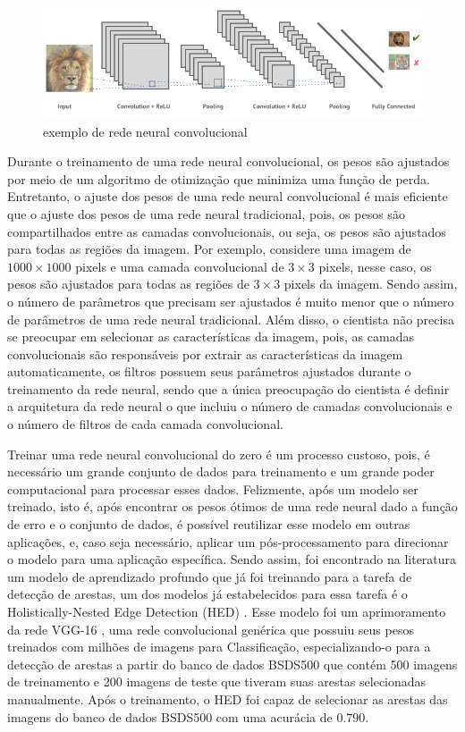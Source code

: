\documentclass[12pt]{article}
\begin{document}
\begin{figure}[H]
\centering
\includegraphics[scale=0.45]{conv.png}
\caption{exemplo de rede neural convolucional}
\label{fig:conv}
\end{figure}


Durante o treinamento de uma rede neural convolucional, os pesos são ajustados por meio de um algoritmo de otimização que minimiza uma função de perda. Entretanto, o ajuste dos pesos de uma rede neural convolucional é mais eficiente que o ajuste dos pesos de uma rede neural tradicional, pois, os pesos são compartilhados entre as camadas convolucionais, ou seja, os pesos são ajustados para todas as regiões da imagem. Por exemplo, considere uma imagem de $1000\times1000$ pixels e uma camada convolucional de $3\times3$ pixels, nesse caso, os pesos são ajustados para todas as regiões de $3\times3$ pixels da imagem. Sendo assim, o número de parâmetros que precisam ser ajustados é muito menor que o número de parâmetros de uma rede neural tradicional. Além disso, o cientista não precisa se preocupar em selecionar as características da imagem, pois, as camadas convolucionais são responsáveis por extrair as características da imagem automaticamente, os filtros possuem seus parâmetros ajustados durante o treinamento da rede neural, sendo que a única preocupação do cientista é definir a arquitetura da rede neural o que incluiu o número de camadas convolucionais e o número de filtros de cada camada convolucional.

Treinar uma rede neural convolucional do zero é um processo custoso, pois, é necessário um grande conjunto de dados para treinamento e um grande poder computacional para processar esses dados. Felizmente, após um modelo ser treinado, isto é, após encontrar os pesos ótimos de uma rede neural dado a função de erro e o conjunto de dados, é possível reutilizar esse modelo em outras aplicações, e, caso seja necessário, aplicar um pós-processamento para direcionar o modelo para uma aplicação específica. Sendo assim, foi encontrado na literatura um modelo de aprendizado profundo que já foi treinando para a tarefa de detecção de arestas, um dos modelos já estabelecidos para essa tarefa é o Holistically-Nested Edge Detection (HED) \cite{xie2015holisticallynested}. Esse modelo foi um aprimoramento da rede VGG-16 \cite{VGG16}, uma rede convolucional genérica que possuiu seus pesos treinados com milhões de imagens para Classificação, especializando-o para a detecção de arestas a partir do banco de dados BSDS500 \cite{BSDS500} que contém 500 imagens de treinamento e 200 imagens de teste que tiveram suas arestas selecionadas manualmente. Após o treinamento, o HED foi capaz de selecionar as arestas das imagens do banco de dados BSDS500 com uma acurácia de 0.790.
\end{document}
